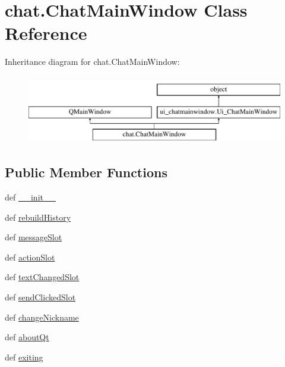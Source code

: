 \hypertarget{classchat_1_1ChatMainWindow}{}\section{chat.\+Chat\+Main\+Window Class Reference}
\label{classchat_1_1ChatMainWindow}
Inheritance diagram for chat.\+Chat\+Main\+Window\+:\begin{figure}[H]
\begin{center}
\leavevmode
\includegraphics[height=3.000000cm]{classchat_1_1ChatMainWindow}
\end{center}
\end{figure}
\subsection*{Public Member Functions}
\begin{DoxyCompactItemize}
\item 
def \hyperlink{classchat_1_1ChatMainWindow_a38646ef8609f7b679e6449c934e51985}{\+\_\+\+\_\+init\+\_\+\+\_\+}
\item 
def \hyperlink{classchat_1_1ChatMainWindow_a1e3b136e60629f836711420d516280b6}{rebuild\+History}
\item 
def \hyperlink{classchat_1_1ChatMainWindow_a8f80a0de8cf477e4f583a1aa0a4f7670}{message\+Slot}
\item 
def \hyperlink{classchat_1_1ChatMainWindow_abbb498b26a3e2c874ea805b7a5f51724}{action\+Slot}
\item 
def \hyperlink{classchat_1_1ChatMainWindow_a9cd7ef378d5fa5669114fb3b7d95e09c}{text\+Changed\+Slot}
\item 
def \hyperlink{classchat_1_1ChatMainWindow_a9e386e9dd625c248c4be06ec692d5763}{send\+Clicked\+Slot}
\item 
def \hyperlink{classchat_1_1ChatMainWindow_a777652e01d29e9bbcc93be02b3472c8b}{change\+Nickname}
\item 
def \hyperlink{classchat_1_1ChatMainWindow_aa4974f4cbfbe462face7d66140e418bc}{about\+Qt}
\item 
def \hyperlink{classchat_1_1ChatMainWindow_a3ed0a3daf6f29464e9a438fa008c4edb}{exiting}
\end{DoxyCompactItemize}

